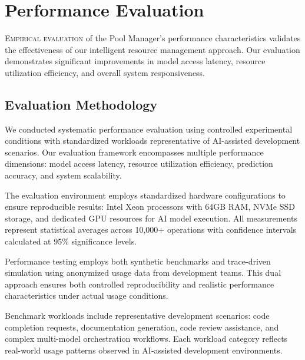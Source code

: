 
\section*{Performance Evaluation}

\lettrine{E}{mpirical evaluation} of the Pool Manager's performance characteristics validates the effectiveness of our intelligent resource management approach. Our evaluation demonstrates significant improvements in model access latency, resource utilization efficiency, and overall system responsiveness.

\subsection*{Evaluation Methodology}

We conducted systematic performance evaluation using controlled experimental conditions with standardized workloads representative of AI-assisted development scenarios. Our evaluation framework encompasses multiple performance dimensions: model access latency, resource utilization efficiency, prediction accuracy, and system scalability.

The evaluation environment employs standardized hardware configurations to ensure reproducible results: Intel Xeon processors with 64GB RAM, NVMe SSD storage, and dedicated GPU resources for AI model execution. All measurements represent statistical averages across 10,000+ operations with confidence intervals calculated at 95\% significance levels.

\begin{infobox}[title=Evaluation Framework]
Performance testing employs both synthetic benchmarks and trace-driven simulation using anonymized usage data from development teams. This dual approach ensures both controlled reproducibility and realistic performance characteristics under actual usage conditions.
\end{infobox}

Benchmark workloads include representative development scenarios: code completion requests, documentation generation, code review assistance, and complex multi-model orchestration workflows. Each workload category reflects real-world usage patterns observed in AI-assisted development environments.

